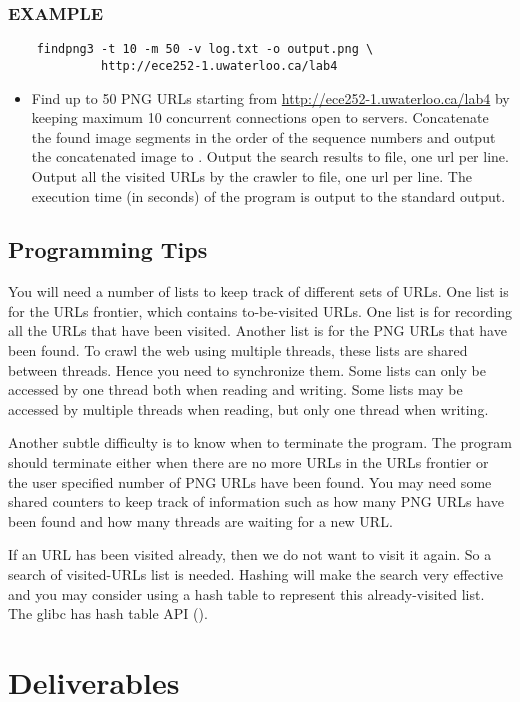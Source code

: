 \subsubsection*{EXAMPLE}
\begin{verbatim}
    findpng3 -t 10 -m 50 -v log.txt -o output.png \
             http://ece252-1.uwaterloo.ca/lab4
\end{verbatim}
\begin{itemize}
\item[]Find up to 50 PNG URLs starting from \url{http://ece252-1.uwaterloo.ca/lab4} by keeping maximum 10 concurrent connections open to servers.
Concatenate the found image segments in the order of the sequence numbers and output the concatenated image to \code{output.png}. 
Output the search results to \code{png\_urls.txt} file, one url per line. Output all the visited URLs by the crawler to  file, one url per line. The execution time (in seconds) of the program is output to the standard output.
\end{itemize}


\subsection{Programming Tips}
You will need a number of lists to keep track of different sets of URLs. One list is for the URLs frontier, which contains to-be-visited URLs. One list is for recording all the URLs that have been visited. Another list is for the PNG URLs that have been found. To crawl the web using multiple threads, these lists are shared between threads. Hence you need to synchronize them. Some lists can only be accessed by one thread both when reading and writing. Some lists may be accessed by multiple threads when reading, but only one thread when writing.

Another subtle difficulty is to know when to terminate the program. The program should terminate either when there are no more URLs in the URLs frontier or the user specified number of PNG URLs have been found. You may need some shared counters to keep track of information such as how many PNG URLs have been found and how many threads are waiting for a new URL.

If an URL has been visited already, then we do not want to visit it again. So a search of visited-URLs list is needed. Hashing will make the search very effective and you may consider using a hash table to represent this already-visited list. The glibc has hash table API ().
\fi
\section{Deliverables}
